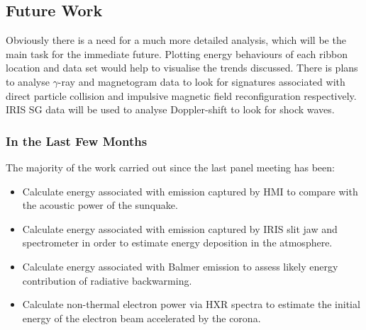   

\subsection{Future Work}
Obviously there is a need for a much more detailed analysis, which will be the main task for the immediate future. Plotting energy behaviours of each ribbon location and data set would help to visualise the trends discussed. There is plans to analyse $\gamma$-ray and magnetogram data to look for signatures associated with direct particle collision and impulsive magnetic field reconfiguration respectively. IRIS SG data will be used to analyse Doppler-shift to look for shock waves.

\subsubsection{In the Last Few Months}
The majority of the work carried out since the last panel meeting has been:
\begin{itemize}
\item Calculate energy associated with emission captured by HMI to compare with the acoustic power of the sunquake.
\item Calculate energy associated with emission captured by IRIS slit jaw and spectrometer in order to estimate energy deposition in the atmosphere.
\item Calculate energy associated with Balmer emission to assess likely energy contribution of radiative backwarming.
\item Calculate non-thermal electron power via HXR spectra to estimate the initial energy of the electron beam accelerated by the corona.
\end{itemize}




